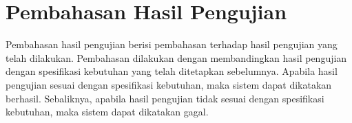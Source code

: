 \section{Pembahasan Hasil Pengujian}
Pembahasan hasil pengujian berisi pembahasan terhadap hasil pengujian yang telah dilakukan. Pembahasan dilakukan dengan membandingkan hasil pengujian dengan spesifikasi kebutuhan yang telah ditetapkan sebelumnya. Apabila hasil pengujian sesuai dengan spesifikasi kebutuhan, maka sistem dapat dikatakan berhasil. Sebaliknya, apabila hasil pengujian tidak sesuai dengan spesifikasi kebutuhan, maka sistem dapat dikatakan gagal.